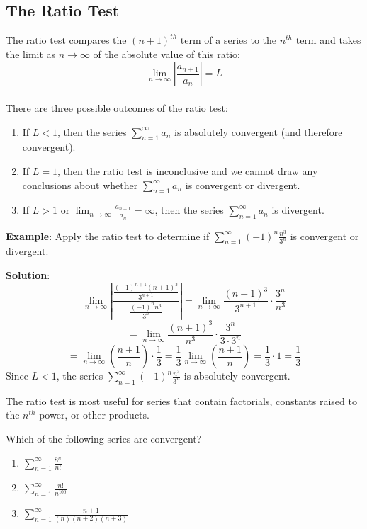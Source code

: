 \subsection{The Ratio Test}
The ratio test compares the $(n + 1)^{th}$ term of a series 
to the $n^{th}$ term and takes the limit as $n \to \infty$ of the absolute 
value of this ratio:
$$\lim_{n \to \infty} \left| \frac{a_{n + 1}}{a_n} \right| = L$$\\
There are three possible outcomes of the ratio test:
\begin{enumerate}
\item If $L < 1$, then the series $\sum_{n=1}^\infty a_n$ is absolutely 
convergent (and therefore convergent).
\item If $L = 1$, then the ratio test is inconclusive and we cannot draw any 
conclusions about whether $\sum_{n=1}^\infty a_n$ is convergent or divergent.
\item If $L > 1$ or $\lim_{n \to \infty} \frac{a_{n + 1}}{a_n} = \infty$, then 
the series $\sum_{n=1}^\infty a_n$ is divergent.
\end{enumerate}

\textbf{Example}: Apply the ratio test to determine if $\sum_{n=1}^\infty 
(-1)^n \frac{n^3}{3^n}$ is convergent or divergent. 

\textbf{Solution}: 
$$\lim_{n \to \infty} \left| \frac{\frac{(-1)^{n + 1}(n + 1)^3}{3^{n + 1}}}{
\frac{(-1)^n n^3}{3^n}} \right| = \lim_{n \to \infty} \frac{(n + 1)^3}{3^{n + 
1}} \cdot \frac{3^n}{n^3}$$
$$= \lim_{n \to \infty} \frac{(n + 1)^3}{n^3} \cdot \frac{3^n}{3 \cdot 3^n}$$
$$= \lim_{n \to \infty} \left( \frac{n + 1}{n} \right) \cdot \frac{1}{3} = 
\frac{1}{3} \lim_{n \to \infty} \left( \frac{n + 1}{n} \right) = \frac{1}{3} 
\cdot 1 = \frac{1}{3} $$
Since $L < 1$, the series $\sum_{n=1}^\infty (-1)^n \frac{n^3}{3^n}$ is 
absolutely convergent. 

The ratio test is most useful for series that contain factorials, constants 
raised to the $n^{th}$ power, or other products. 

\begin{Exercise} Which of the following series are 
convergent?
\begin{enumerate}
\item $\sum_{n=1}^\infty \frac{8^n}{n!}$
\item $\sum_{n=1}^\infty \frac{n!}{n^{100}}$
\item $\sum_{n=1}^\infty \frac{n + 1}{(n)(n+2)(n+3)}$
\end{enumerate}
\end{Exercise}

